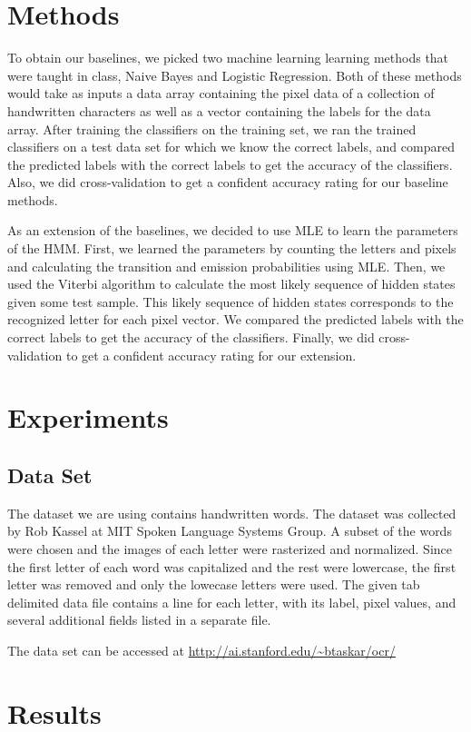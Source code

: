 \documentclass{article} %
\begin{document}
\section{Methods}
To obtain our baselines, we picked two machine learning learning methods that were taught in class, Naive Bayes and Logistic Regression. Both of these methods would take as inputs a data array containing the pixel data of a collection of handwritten characters as well as a vector containing the labels for the data array. After training the classifiers on the training set, we ran the trained classifiers on a test data set for which we know the correct labels, and compared the predicted labels with the correct labels to get the accuracy of the classifiers. Also, we did cross-validation to get a confident accuracy rating for our baseline methods. 

As an extension of the baselines, we decided to use MLE to learn the parameters of the HMM. First, we learned the parameters by counting the letters and pixels and calculating the transition and emission probabilities using MLE. Then, we used the Viterbi algorithm to calculate the most likely sequence of hidden states given some test sample. This likely sequence of hidden states corresponds to the recognized letter for each pixel vector. We compared the predicted labels with the correct labels to get the accuracy of the classifiers. Finally, we did cross-validation to get a confident accuracy rating for our extension. 

\section{Experiments}
\subsection{Data Set}
The dataset we are using contains handwritten words. The dataset was collected by Rob Kassel at MIT Spoken Language Systems Group. A subset of the words were chosen and the images of each letter were rasterized and normalized. Since the first letter of each word was capitalized and the rest were lowercase, the first letter was removed and only the lowecase letters were used. The given tab delimited data file  contains a line for each letter, with its label, pixel values, and several additional fields listed in a separate file. 

The data set can be accessed at \url{http://ai.stanford.edu/~btaskar/ocr/}

\section{Results}
\end{document}
